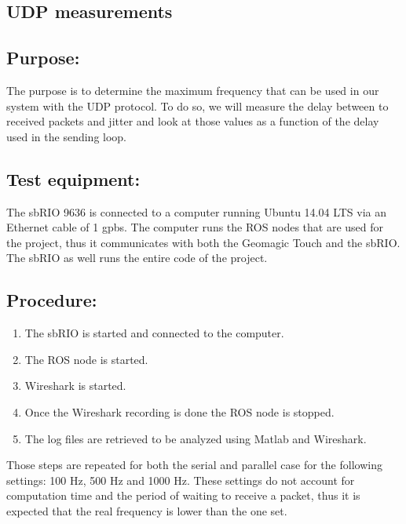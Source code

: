 \subsection{UDP measurements}\label{sec_udp_mes}

\subsection*{Purpose:}

The purpose is to determine the maximum frequency that can be used in our system with the UDP protocol. To do so, we will measure the delay between to received packets and jitter and look at those values as a function of the delay used in the sending loop.

\subsection*{Test equipment:}

The sbRIO 9636 is connected to a computer running Ubuntu 14.04 LTS via an Ethernet cable of 1 gpbs. The computer runs the ROS nodes that are used for the project, thus it communicates with both the Geomagic Touch and the sbRIO. The sbRIO as well runs the entire code of the project.

\subsection*{Procedure:}

\begin{enumerate}
	\item The sbRIO is started and connected to the computer.
	\item The ROS node is started.
	\item Wireshark is started.%
	\item Once the Wireshark recording is done the ROS node is stopped.
	\item The log files are retrieved to be analyzed using Matlab and Wireshark.
\end{enumerate}
Those steps are repeated for both the serial and parallel case for the following settings: 100 Hz, 500 Hz and 1000 Hz. These settings do not account for computation time and the period of waiting to receive a packet, thus it is expected that the real frequency is lower than the one set.


